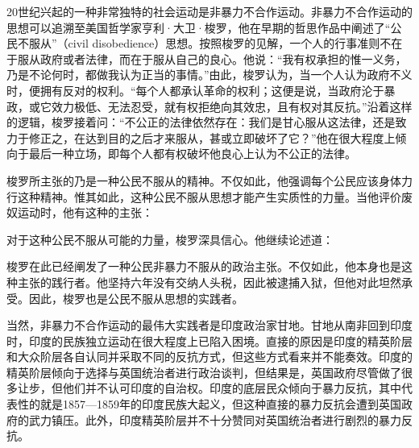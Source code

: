 {{20世纪兴起的一种非常独特的社会运动是非暴力不合作运动。非暴力不合作运动的思想可以追溯至美国哲学家亨利·大卫·梭罗，他在早期的哲思作品中阐述了“公民不服从”（civil disobedience）思想。按照梭罗的见解，一个人的行事准则不在于服从政府或者法律，而在于服从自己的良心。他说：“我有权承担的惟一义务，乃是不论何时，都做我认为正当的事情。”由此，梭罗认为，当一个人认为政府不义时，便拥有反对的权利。“每个人都承认革命的权利；这便是说，当政府沦于暴政，或它效力极低、无法忍受，就有权拒绝向其效忠，且有权对其反抗。”沿着这样的逻辑，梭罗接着问：“不公正的法律依然存在：我们是甘心服从这法律，还是致力于修正之，在达到目的之后才来服从，甚或立即破坏了它？”他在很大程度上倾向于最后一种立场，即每个人都有权破坏他良心上认为不公正的法律。

梭罗所主张的乃是一种公民不服从的精神。不仅如此，他强调每个公民应该身体力行这种精神。惟其如此，这种公民不服从思想才能产生实质性的力量。当他评价废奴运动时，他有这种的主张：


对于这种公民不服从可能的力量，梭罗深具信心。他继续论述道：


梭罗在此已经阐发了一种公民非暴力不服从的政治主张。不仅如此，他本身也是这种主张的践行者。他坚持六年没有交纳人头税，因此被逮捕入狱，但他对此坦然承受。因此，梭罗也是公民不服从思想的实践者。

当然，非暴力不合作运动的最伟大实践者是印度政治家甘地。甘地从南非回到印度时，印度的民族独立运动在很大程度上已陷入困境。直接的原因是印度的精英阶层和大众阶层各自认同并采取不同的反抗方式，但这些方式看来并不能奏效。印度的精英阶层倾向于选择与英国统治者进行政治谈判，但结果是，英国政府尽管做了很多让步，但他们并不认可印度的自治权。印度的底层民众倾向于暴力反抗，其中代表性的就是1857—1859年的印度民族大起义，但这种直接的暴力反抗会遭到英国政府的武力镇压。此外，印度精英阶层并不十分赞同对英国统治者进行剧烈的暴力反抗。

}}
